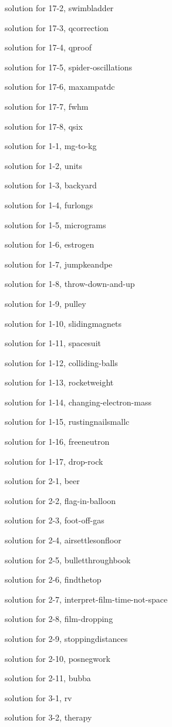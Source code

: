 \documentclass{problems}
\begin{document}
solution for 17-2, swimbladder

solution for 17-3, qcorrection

solution for 17-4, qproof

solution for 17-5, spider-oscillations

solution for 17-6, maxampatdc

solution for 17-7, fwhm

solution for 17-8, qsix

solution for 1-1, mg-to-kg

solution for 1-2, units

solution for 1-3, backyard

solution for 1-4, furlongs

solution for 1-5, micrograms

solution for 1-6, estrogen

solution for 1-7, jumpkeandpe

solution for 1-8, throw-down-and-up

solution for 1-9, pulley

solution for 1-10, slidingmagnets

solution for 1-11, spacesuit

solution for 1-12, colliding-balls

solution for 1-13, rocketweight

solution for 1-14, changing-electron-mass

solution for 1-15, rustingnailsmallc

solution for 1-16, freeneutron

solution for 1-17, drop-rock

solution for 2-1, beer

solution for 2-2, flag-in-balloon

solution for 2-3, foot-off-gas

solution for 2-4, airsettlesonfloor

solution for 2-5, bulletthroughbook

solution for 2-6, findthetop

solution for 2-7, interpret-film-time-not-space

solution for 2-8, film-dropping

solution for 2-9, stoppingdistances

solution for 2-10, posnegwork

solution for 2-11, bubba

solution for 3-1, rv

solution for 3-2, therapy
\end{document}
